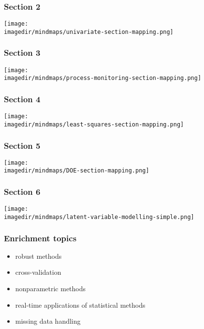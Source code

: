 \begin{frame}\frametitle{Section 2}
	
	\texttt{[image: \\imagedir/mindmaps/univariate-section-mapping.png]}
\end{frame}

\begin{frame}\frametitle{Section 3}
	
	\texttt{[image: \\imagedir/mindmaps/process-monitoring-section-mapping.png]}
\end{frame}

\begin{frame}\frametitle{Section 4}
	
	\texttt{[image: \\imagedir/mindmaps/least-squares-section-mapping.png]}
\end{frame}

\begin{frame}\frametitle{Section 5}
	
	\texttt{[image: \\imagedir/mindmaps/DOE-section-mapping.png]}
\end{frame}

\begin{frame}\frametitle{Section 6}
	
	\texttt{[image: \\imagedir/mindmaps/latent-variable-modelling-simple.png]}
\end{frame}

\begin{frame}\frametitle{Enrichment topics}
	\begin{itemize}
		\item	robust methods 
		\item	cross-validation 
		\item	nonparametric methods 
		\item	real-time applications of statistical methods 
		\item	missing data handling 
	\end{itemize}
\end{frame}
